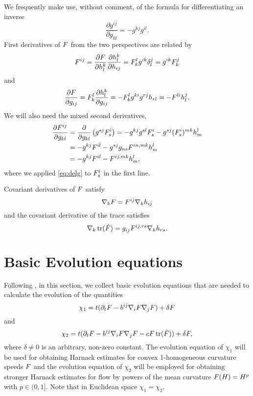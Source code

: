 \documentclass{amsart}
\begin{document}
We frequently make use, without comment, of the formula for differentiating an inverse
\[
\frac{\partial g^{ij}}{\partial g_{kl}} = - g^{kj} g^{il}.
\]
First derivatives of \(F\) from the two perspectives are related by
\begin{equation}
\label{eq:delh}
F^{ij} = \frac{\partial F}{\partial h_l^k} \frac{\partial h_l^k}{\partial h_{ij}} = F^l_k g^{ik} \delta^j_l = g^{ik} F^j_k
\end{equation}
and
\begin{equation}
\label{eq:delg}
\frac{\partial F}{\partial g_{ij}} = F^{l}_{k} \frac{\partial h^{k}_{l}}{\partial g_{ij}} = -F^{l}_{k} g^{ki} g^{rj} h_{rl} = -F^{li}h^{j}_{l}.
\end{equation}
We will also need the mixed second derivatives,
\begin{equation}
\label{eq:delhdelg}
\begin{split}
\frac{\partial F^{ij}}{\partial g_{kl}} &= \frac{\partial}{\partial g_{kl}} \left(g^{sj} F^{i}_{s} \right) = - g^{kj}g^{sl} F^{i}_{s} - g^{sj} (F^i_s)^{mk} h^l_m \\
&= - g^{kj} F^{il} - g^{sj} g_{ns} F^{in,mk} h^l_m \\
&= - g^{kj} F^{il} - F^{ij,mk} h^l_m,
\end{split}
\end{equation}
where we applied \eqref{eq:delg} to \(F^i_s\) in the first line.

Covariant derivatives of \(F\) satisfy
\begin{equation}
\label{eq:delphi}
\nabla_k F = F^{ij} \nabla_k h_{ij}
\end{equation}
and the covariant derivative of the trace satisfies
\begin{equation}
\label{eq:delPhi}
\nabla_k \operatorname{tr}(\dot{F}) = g_{ij} F^{ij,rs} \nabla_k h_{rs}.
\end{equation}

\section{Basic Evolution equations}
\label{sec:basic_evolution}

Following \cite{Andrews:09/1994, Chow:06/1991, Hamilton:/1995, Smoczyk:/1997}, in this section, we collect basic evolution equations that are needed to calculate the evolution of the quantities
\[
\chi_1 =t(\partial_t F- b^{ij} \nabla_i F \nabla_j F) +\delta F
\]
and
\[
\chi_2 =t(\partial_t F - b^{ij} \nabla_i F \nabla_j F - c F \operatorname{tr}(\dot{F})) +\delta F,
\]
where \(\delta \ne 0\) is an arbitrary, non-zero constant. The evolution equation of $\chi_1$ will be used for obtaining Harnack estimates for convex 1-homogeneous curvature speeds $F$ and the evolution equation of $\chi_2$ will be employed for obtaining stronger Harnack estimates for flow by powers of the mean curvature $F(H)=H^{p}$ with $p\in(0,1].$ Note that in Euclidean space $\chi_1=\chi_2.$
\end{document}
